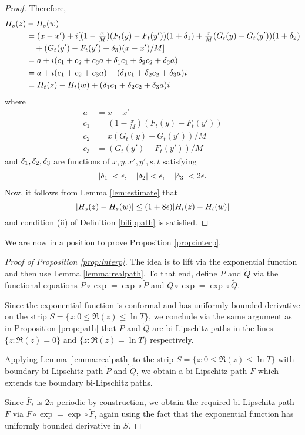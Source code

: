 \documentclass{amsart}
\begin{document}
\begin{proof}
Therefore,
\begin{align*} 
H_s(z) &- H_s(w)\\ 
&= (x-x') + i [ (1-\tfrac{x}{M})(F_t(y)-F_t(y'))(1+\delta_1) + \tfrac{x}{M}(G_t(y)-G_t(y'))(1+\delta_2)\\ 
&\quad+ (G_t(y')-F_t(y') +\delta_3)(x-x')/M ]\\
&= a + i(c_1 + c_2 + c_3a + \delta_1 c_1 + \delta_2c_2 + \delta_3a)\\
&= a + i(c_1 + c_2 + c_3a) + (\delta_1 c_1 + \delta_2c_2 + \delta_3a)i\\
&= H_t(z)-H_t(w) +  (\delta_1 c_1 + \delta_2c_2 + \delta_3a)i
\end{align*}
where
\begin{align*}
a&= x-x'\\
c_1&= (1-\tfrac{x}{M})(F_t(y)-F_t(y'))\\
c_2&= x(G_t(y)-G_t(y'))/M\\
c_3&= (G_t(y')-F_t(y'))/M
\end{align*}
and $\delta_1,\delta_2,\delta_3$ are functions of $x,y,x',y',s,t$ satisfying
\begin{align*}
|\delta_1|<\epsilon, \quad |\delta_2|<\epsilon, \quad |\delta_3|< 2\epsilon.
\end{align*}
Now, it follows from Lemma \ref{lem:estimate} that
\[ |H_s(z) - H_s(w)| \leq (1+8\epsilon)|H_t(z)-H_t(w)|\]
and condition (ii) of Definition \ref{bilippath} is satisfied.
\end{proof}

We are now in a position to prove Proposition \ref{prop:interp}.

\begin{proof}[Proof of Proposition \ref{prop:interp}]
The idea is to lift via the exponential function and then use Lemma \ref{lemma:realpath}. To that end, define $\widetilde{P}$ and $\widetilde{Q}$ via the functional equations $P\circ \exp = \exp \circ \widetilde{P}$ and $Q\circ \exp = \exp \circ \widetilde{Q}$. 

Since the exponential function is conformal and has uniformly bounded derivative on the strip $S = \{ z : 0 \leq \Re(z) \leq \ln T \}$, we conclude via the same argument as in Proposition \ref{prop:path} that $\widetilde{P}$ and $\widetilde{Q}$ are bi-Lipschitz paths in the lines $\{z : \Re(z) = 0\}$ and $\{z : \Re(z) = \ln T \}$ respectively.

Applying Lemma \ref{lemma:realpath} to the strip $S = \{ z : 0 \leq \Re(z) \leq \ln T\}$ with boundary bi-Lipschitz path $\widetilde{P}$ and $\widetilde{Q}$, we obtain a bi-Lipschitz path $\widetilde{F}$ which extends the boundary bi-Lipschitz paths.

Since $\widetilde{F_t}$ is $2\pi$-periodic by construction, we obtain the required bi-Lipschitz path $F$ via $F \circ \exp = \exp \circ \widetilde{F}$, again using the fact that the exponential function has uniformly bounded derivative in $S$.
\end{proof}
\end{document}
